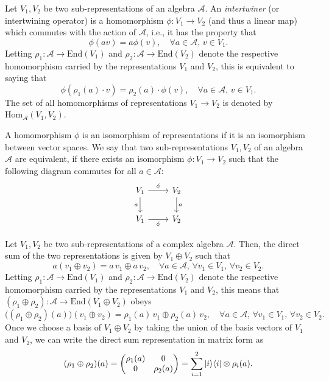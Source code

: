 \begin{definition}[Intertwiner]\label{def:intertwiner}
Let $V_1,V_2$ be two sub-representations of an algebra $\mathcal{A}$. An \emph{intertwiner} (or intertwining operator) is a homomorphism $\phi: V_1 \rightarrow V_2$ (and thus a linear map) which commutes with the action of $\mathcal{A}$, i.e., it has the property that
$$
\phi(a v) = a\phi(v), \quad \forall a \in \mathcal{A}, \, v \in V_1.
$$
Letting $\rho_1: \mathcal{A} \rightarrow \mathrm{End}(V_1)$ and $\rho_2: \mathcal{A} \rightarrow \mathrm{End}(V_2)$ denote the respective homomorphism carried by the representations $V_1$ and $V_2$, this is equivalent to saying that
$$
\phi(\rho_1(a)\cdot v) = \rho_2(a) \cdot \phi(v), \quad \forall a \in \mathcal{A}, \, v \in V_1.
$$The set of all homomorphisms of representations $V_1 \rightarrow V_2$ is denoted by $\mathrm{Hom}_{\mathcal{A}}(V_1, V_2)$.

A homomorphism $\phi$ is an isomorphism of representations if it is an isomorphism between vector spaces. We say that two sub-representations $V_1,V_2$ of an algebra $\mathcal{A}$ are equivalent, if there exists an isomorphism $\phi: V_1 \rightarrow V_2$ such that the following diagram commutes for all $a \in \mathcal{A}$:
\[
\begin{tikzcd}
V_1 \arrow[r, "\phi"] \arrow[d, "a"'] & V_2 \arrow[d, "a"] \\
V_1 \arrow[r, "\phi"'] & V_2
\end{tikzcd}
\]
\end{definition}


\begin{definition}\label{def:direct-sum-repr}
Let $V_1,V_2$ be two sub-representations of a complex algebra $\mathcal{A}$. Then, the direct sum of the two representations is given by $V_1 \oplus V_2$ such that
$$
a (v_1 \oplus v_2) = a \, v_1 \oplus a \, v_2, \quad \forall a \in \mathcal{A}, \,\forall v_1 \in V_1, \, \forall v_2 \in V_2.
$$
Letting $\rho_1: \mathcal{A} \rightarrow \mathrm{End}(V_1)$ and $\rho_2: \mathcal{A} \rightarrow \mathrm{End}(V_2)$ denote the respective homomorphism carried by the representations $V_1$ and $V_2$, this means that $(\rho_1 \oplus \rho_2): \mathcal{A} \rightarrow \mathrm{End}(V_1 \oplus V_2)$ obeys
$$
\big((\rho_1 \oplus \rho_2)(a)\big) (v_1 \oplus v_2) = \rho_1(a) \, v_1 \oplus \rho_2(a) \, v_2, \quad \forall a \in \mathcal{A}, \,\forall v_1 \in V_1, \, \forall v_2 \in V_2.
$$
Once we choose a basis of $V_1 \oplus V_2$ by taking the union of the basis vectors of $V_1$ and $V_2$, we can write the direct sum representation in matrix form as
$$
(\rho_1 \oplus \rho_2)(a) =
\begin{pmatrix}
\rho_1(a) & 0\\
0 & \rho_2(a)
\end{pmatrix} = \sum_{i=1}^2 \ket{i}\!\bra{i} \otimes \rho_i(a).
$$ 
\end{definition}

